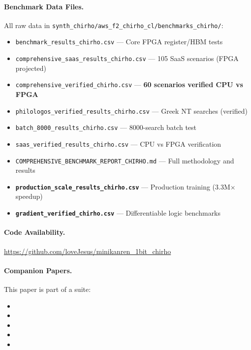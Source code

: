 \documentclass[11pt,a4paper]{article}
\begin{document}
\paragraph{Benchmark Data Files.}
All raw data in \texttt{synth\_chirho/aws\_f2\_chirho\_cl/benchmarks\_chirho/}:
\begin{itemize}
  \item \texttt{benchmark\_results\_chirho.csv} --- Core FPGA register/HBM tests
  \item \texttt{comprehensive\_saas\_results\_chirho.csv} --- 105 SaaS scenarios (FPGA projected)
  \item \texttt{comprehensive\_verified\_chirho.csv} --- \textbf{60 scenarios verified CPU vs FPGA}
  \item \texttt{philologos\_verified\_results\_chirho.csv} --- Greek NT searches (verified)
  \item \texttt{batch\_8000\_results\_chirho.csv} --- 8000-search batch test
  \item \texttt{saas\_verified\_results\_chirho.csv} --- CPU vs FPGA verification
  \item \texttt{COMPREHENSIVE\_BENCHMARK\_REPORT\_CHIRHO.md} --- Full methodology and results
  \item \textbf{\texttt{production\_scale\_results\_chirho.csv}} --- Production training (3.3M$\times$ speedup)
  \item \textbf{\texttt{gradient\_verified\_chirho.csv}} --- Differentiable logic benchmarks
\end{itemize}

\paragraph{Code Availability.}
\url{https://github.com/loveJesus/minikanren_1bit_chirho}

\paragraph{Companion Papers.}
This paper is part of a suite:
\begin{itemize}
  \item \paperA
  \item \paperB
  \item \paperC
  \item \paperD
  \item \paperF
\end{itemize}

\end{document}

